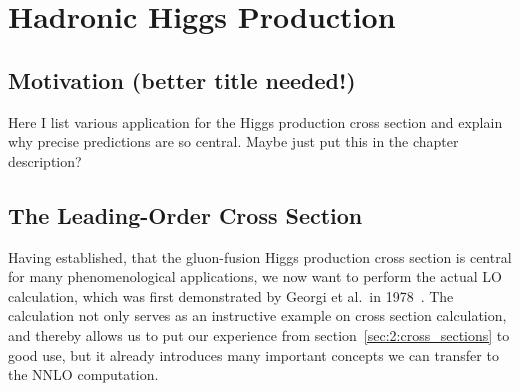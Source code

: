 
\chapter{Hadronic Higgs Production}\label{chap:three}

\section{Motivation (better title needed!)}
Here I list various application for the Higgs production cross section and explain why precise predictions are so central. Maybe just put this in the chapter description?
\section{The Leading-Order Cross Section} \label{sec:4:LO_xSec}
Having established, that the gluon-fusion Higgs production cross section is central for many phenomenological applications, we now want to perform the actual \acs{LO} calculation, which was first demonstrated by Georgi et al.\ in 1978~\cite{Georgi:1977gs}. The calculation not only serves as an instructive example on cross section calculation, and thereby allows us to put our experience from section~\ref{sec:2:cross_sections} to good use, but it already introduces many important concepts we can transfer to the \acs{NNLO} computation.

